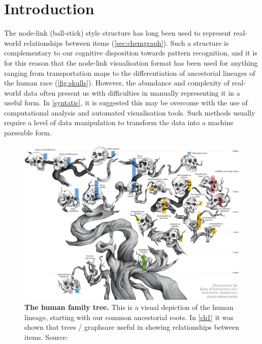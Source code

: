 
\section{Introduction}
The node-link (ball-stick) style structure has long been used to represent real-world relationships between items (\autoref{sec:chemgraph}). Such a structure is complementary to our cognitive disposition towards pattern recognition, and it is for this reason that the node-link visualisation format has been used for anything ranging from transportation maps \citep{beck} to the differentiation of ancestorial lineages of the human race (\autoref{fig:skulls}). However, the abundance and complexity of real-world data often present us with difficulties in manually representing it in a useful form. In \autoref{syntatic}, it is suggested this may be overcome with the use of computational analysis and automated visualisation tools. Such methods usually require a level of data manipulation to transform the data into a machine parseable form.

\begin{figure}[H]
     \centering
         \includegraphics[width=\textwidth]{figures_c3/humanskulls.png}

        \caption{\textbf{The human family tree.} This is a visual depiction of the human lineage, starting with our common ancestorial roots. In \autoref{ch1}  it was shown that trees / graphs\protect\footnotemark are useful in showing relationships between items. Source: \citep{skull}}
        \label{fig:skulls}
\end{figure}



